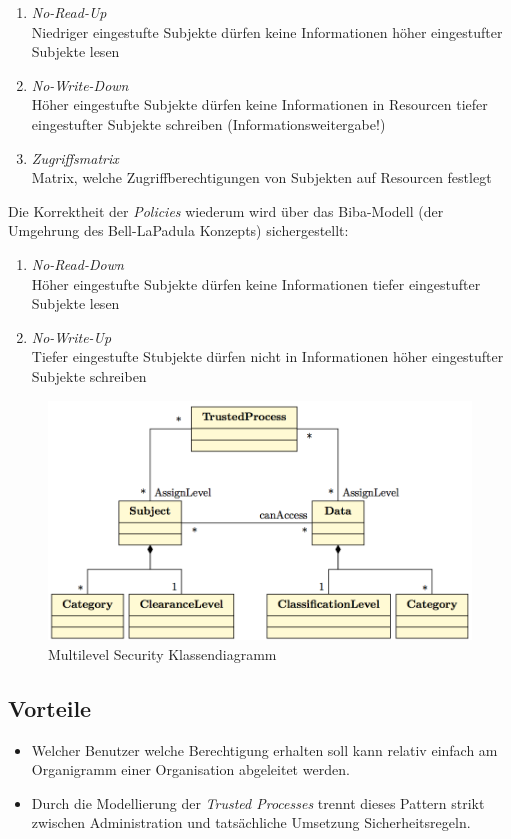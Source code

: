 \begin{enumerate}
	\item \emph{No-Read-Up}\\
	Niedriger eingestufte Subjekte dürfen keine Informationen höher eingestufter Subjekte lesen
	\item \emph{No-Write-Down}\\
	Höher eingestufte Subjekte dürfen keine Informationen in Resourcen tiefer eingestufter Subjekte schreiben (Informationsweitergabe!)
	\item \emph{Zugriffsmatrix}\\
	Matrix, welche Zugriffberechtigungen von Subjekten auf Resourcen festlegt
\end{enumerate}


Die Korrektheit der \emph{Policies} wiederum wird über das Biba-Modell\cite{Biba} (der Umgehrung des Bell-LaPadula Konzepts) sichergestellt:

\begin{enumerate}
	\item \emph{No-Read-Down}\\
	Höher eingestufte Subjekte dürfen keine Informationen tiefer eingestufter Subjekte lesen
	\item \emph{No-Write-Up}\\
	Tiefer eingestufte Stubjekte dürfen nicht in Informationen höher eingestufter Subjekte schreiben
\end{enumerate}


\begin{figure}[H]
	\includegraphics[width=\textwidth]{content/security/accesscontrolmodels/images/multilevelsecurity.png}
\caption{Multilevel Security Klassendiagramm}
\end{figure}

\subsection*{Vorteile}
\begin{itemize}
	\item Welcher Benutzer welche Berechtigung erhalten soll kann relativ einfach am Organigramm einer Organisation abgeleitet werden.
	\item Durch die Modellierung der \emph{Trusted Processes} trennt dieses Pattern strikt zwischen Administration und tatsächliche Umsetzung Sicherheitsregeln.
\end{itemize}

